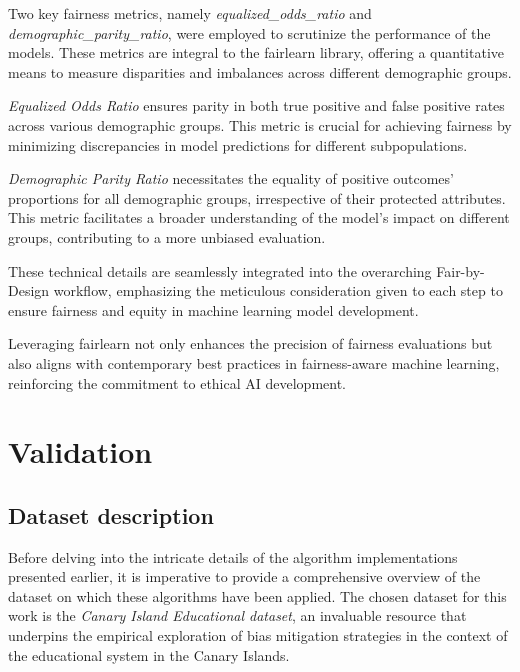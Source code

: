 Two key fairness metrics, namely \emph{equalized\_odds\_ratio} and \emph{demographic\_parity\_ratio}, were employed to scrutinize the performance of the models. These metrics are integral to the fairlearn library, offering a quantitative means to measure disparities and imbalances across different demographic groups.

\emph{Equalized Odds Ratio} ensures parity in both true positive and false positive rates across various demographic groups. This metric is crucial for achieving fairness by minimizing discrepancies in model predictions for different subpopulations.

\emph{Demographic Parity Ratio} necessitates the equality of positive outcomes' proportions for all demographic groups, irrespective of their protected attributes. This metric facilitates a broader understanding of the model's impact on different groups, contributing to a more unbiased evaluation.

These technical details are seamlessly integrated into the overarching Fair-by-Design workflow, emphasizing the meticulous consideration given to each step to ensure fairness and equity in machine learning model development.

Leveraging fairlearn not only enhances the precision of fairness evaluations but also aligns with contemporary best practices in fairness-aware machine learning, reinforcing the commitment to ethical AI development.

\chapter{Validation} %
\label{chap:validation}
\section{Dataset description}

Before delving into the intricate details of the algorithm implementations presented earlier, it is imperative to provide a comprehensive overview of the dataset on which these algorithms have been applied. The chosen dataset for this work is the \emph{Canary Island Educational dataset}, an invaluable resource that underpins the empirical exploration of bias mitigation strategies in the context of the educational system in the Canary Islands. 

